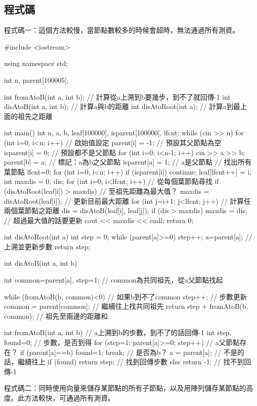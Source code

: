 \subsection{程式碼}
程式碼一：這個方法較慢，當節點數較多的時候會超時，無法通過所有測資。
\begin{cppcode}
#include <iostream>

using namespace std;

int n, parent[100005];

int fromAtoB(int a, int b); // 計算從a上溯到b要幾步，到不了就回傳-1
int disAtoB(int a, int b); // 計算a與b的距離
int disAtoRoot(int a); // 計算a到最上面的祖先之距離

int main()
{
	int n, a, b, leaf[100000], isparent[100000], lfcnt;
	while (cin >> n) {
		for (int i=0; i<n; i++) { // 啟始值設定
			parent[i] = -1;  // 預設其父節點為空
			isparent[i] = 0; // 預設都不是父節點
		}
		for (int i=0; i<n-1; i++) {
			cin >> a >> b;
			parent[b] = a; // 標記：a為b之父節點
			isparent[a] = 1; // a是父節點
		}
		// 找出所有葉節點
		lfcnt=0;
		for (int i=0; i<n; i++) {
			if (isparent[i]) continue;
			leaf[lfcnt++] = i;
		}
		int maxdis = 0, dis;
		for (int i=0; i<lfcnt; i++) { // 從每個葉節點尋找
			if (disAtoRoot(leaf[i]) > maxdis) { // 至祖先距離為最大值？
				maxdis = disAtoRoot(leaf[i]); // 更新目前最大距離
			}
			for (int j=i+1; j<lfcnt; j++) { // 計算任兩個葉節點之距離
				dis = disAtoB(leaf[i], leaf[j]);
				if (dis > maxdis) maxdis = dis; // 超過最大值的話要更新
			}
		}
		cout << maxdis << endl;
	}
	return 0;
}

int disAtoRoot(int a)
{
	int step = 0;
	while (parent[a]>=0) { step++; a=parent[a]; } // 上溯並更新步數
	return step;
}

int disAtoB(int a, int b)
{
	int common=parent[a], step=1; // common為共同祖先，從a父節點找起
	
	while (fromAtoB(b, common)<0) { // 如果b到不了common
		step++; // 步數更新
		common = parent[common]; // 繼續往上找共同祖先
	}
	return step + fromAtoB(b, common); // 祖先至兩邊的距離和
}

int fromAtoB(int a, int b) // a上溯到b的步數，到不了的話回傳-1
{
	int step, found=0; // 步數，是否到得
	for (step=1; parent[a]>=0; step++) { // a父節點存在？
		if (parent[a]==b) { found=1; break; } // 是否為b？
		a = parent[a]; // 不是的話，繼續往上
	}
	if (found) return step; // 找到回傳步數
	else return -1; // 找不到回傳-1
}
\end{cppcode}
程式碼二：同時使用向量來儲存某節點的所有子節點，以及用陣列儲存某節點的高度。此方法較快，可通過所有測資。
